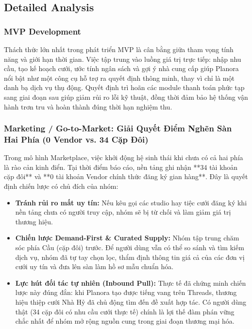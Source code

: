 \documentclass[11pt]{article}
\begin{document}
\subsection*{Detailed Analysis}

\subsubsection*{MVP Development}
Thách thức lớn nhất trong phát triển MVP là cân bằng giữa tham vọng tính năng và giới hạn thời gian. Việc tập trung vào luồng giá trị trực tiếp: nhập nhu cầu, tạo kế hoạch cưới, ước tính ngân sách và gợi ý nhà cung cấp giúp Planora nổi bật như một công cụ hỗ trợ ra quyết định thông minh, thay vì chỉ là một danh bạ dịch vụ thụ động. Quyết định trì hoãn các module thanh toán phức tạp sang giai đoạn sau giúp giảm rủi ro lỗi kỹ thuật, đồng thời đảm bảo hệ thống vận hành trơn tru và hoàn thành đúng thời hạn nghiệm thu.

\subsubsection*{Marketing / Go-to-Market: Giải Quyết Điểm Nghẽn Sàn Hai Phía (0 Vendor vs. 34 Cặp Đôi)}
Trong mô hình Marketplace, việc khởi động hệ sinh thái khi chưa có cả hai phía là rào cản kinh điển. Tại thời điểm báo cáo, nền tảng ghi nhận **34 tài khoản cặp đôi** và **0 tài khoản Vendor chính thức đăng ký gian hàng**. Đây là quyết định chiến lược có chủ đích của nhóm:
\begin{itemize}
    \item \textbf{Tránh rủi ro mất uy tín:} Nếu kêu gọi các studio hay tiệc cưới đăng ký khi nền tảng chưa có người truy cập, nhóm sẽ bị từ chối và làm giảm giá trị thương hiệu.
    \item \textbf{Chiến lược Demand-First \& Curated Supply:} Nhóm tập trung chăm sóc phía Cầu (cặp đôi) trước. Để người dùng vẫn có thể so sánh và tìm kiếm dịch vụ, nhóm đã tự tay chọn lọc, thẩm định thông tin giá cả của các đơn vị cưới uy tín và đưa lên sàn làm hồ sơ mẫu chuẩn hóa.
    \item \textbf{Lực hút đối tác tự nhiên (Inbound Pull):} Thực tế đã chứng minh chiến lược này đúng đắn: khi Planora tạo được tiếng vang trên Threads, thương hiệu thiệp cưới Nhà Hỷ đã chủ động tìm đến đề xuất hợp tác. Có người dùng thật (34 cặp đôi có nhu cầu cưới thực tế) chính là lợi thế đàm phán vững chắc nhất để nhóm mở rộng nguồn cung trong giai đoạn thương mại hóa.
\end{itemize}
\end{document}
